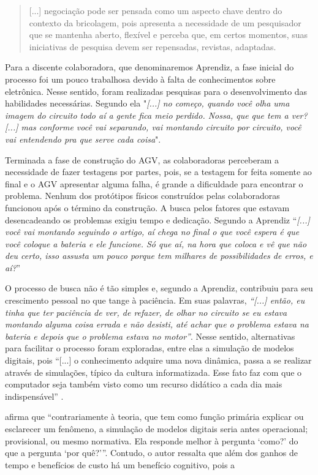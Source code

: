 \documentclass[portuguese]{textolivre}
\begin{document}
\begin{quote}
[...] negociação pode ser pensada como um aspecto chave dentro do contexto da bricolagem, pois apresenta a necessidade de um pesquisador que se mantenha aberto, flexível e perceba que, em certos momentos, suas iniciativas de pesquisa devem ser repensadas, revistas, adaptadas.
\end{quote}

Para a discente colaboradora, que denominaremos Aprendiz, a fase inicial do processo foi um pouco trabalhosa devido à falta de conhecimentos sobre eletrônica. Nesse sentido, foram realizadas pesquisas para o desenvolvimento das habilidades necessárias. Segundo ela "\emph{[...] no começo, quando você olha uma imagem do circuito todo aí a gente fica meio perdido. Nossa, que que tem a ver? [...] mas conforme você vai separando, vai montando circuito por circuito, você vai entendendo pra que serve cada coisa}".

Terminada a fase de construção do AGV, as colaboradoras perceberam a necessidade de fazer testagens por partes, pois, se a testagem for feita somente ao final e o AGV apresentar alguma falha, é grande a dificuldade para encontrar o problema. Nenhum dos protótipos físicos construídos pelas colaboradoras funcionou após o término da construção. A busca pelos fatores que estavam desencadeando os problemas exigiu tempo e dedicação. Segundo a Aprendiz “\emph{[...] você vai montando seguindo o artigo, aí chega no final o que você espera é que você coloque a bateria e ele funcione. Só que aí, na hora que coloca e vê que não deu certo, isso assusta um pouco porque tem milhares de possibilidades de erros, e aí?}”

O processo de busca não é tão simples e, segundo a Aprendiz, contribuiu para seu crescimento pessoal no que tange à paciência. Em suas palavras, \emph{“[...] então, eu tinha que ter paciência de ver, de refazer, de olhar no circuito se eu estava montando alguma coisa errada e não desisti, até achar que o problema estava na bateria e depois que o problema estava no motor”}. Nesse sentido, alternativas para facilitar o processo foram exploradas, entre elas a simulação de modelos digitais, pois “[...] o conhecimento adquire uma nova dinâmica, passa a se realizar através de simulações, típico da cultura informatizada. Esse fato faz com que o computador seja também visto como um recurso didático a cada dia mais indispensável” \cite[p. 70]{BornattoGilmar2022}.

\textcite[p. 74]{Levy1993} afirma que “contrariamente à teoria, que tem como função primária explicar ou esclarecer um fenômeno, a simulação de modelos digitais seria antes operacional; provisional, ou mesmo normativa. Ela responde melhor à pergunta ‘como?’ do que a pergunta ‘por quê?’”. Contudo, o autor ressalta que além dos ganhos de tempo e benefícios de custo há um benefício cognitivo, pois a
\end{document}
